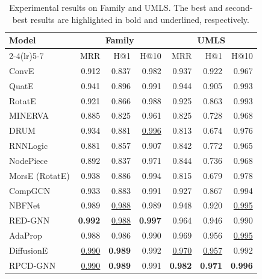 \documentclass[a4paper,fleqn]{cas-dc}
\newcommand{\papertablestyle}{%
  \footnotesize
  \renewcommand{\arraystretch}{1.12}%
  \setlength{\tabcolsep}{3pt}%
}
\begin{document}
\begin{table}[width=0.85\textwidth,pos=t]
\caption{Experimental results on Family and UMLS. The best and second-best results are highlighted in bold and underlined, respectively.}
\label{tab:main-results-small}
\centering
\papertablestyle
\begin{tabular*}{\tblwidth}{@{}l@{\extracolsep{\fill}}rrrrrr@{}}
\toprule
Model
& \multicolumn{3}{c}{Family}
& \multicolumn{3}{c}{UMLS} \\
\cmidrule(lr){2-4}\cmidrule(lr){5-7}
& MRR & H@1 & H@10 & MRR & H@1 & H@10 \\
\midrule
ConvE & 0.912 & 0.837 & 0.982 & 0.937 & 0.922 & 0.967 \\
QuatE & 0.941 & 0.896 & 0.991 & 0.944 & 0.905 & 0.993 \\
RotatE & 0.921 & 0.866 & 0.988 & 0.925 & 0.863 & 0.993 \\
MINERVA & 0.885 & 0.825 & 0.961 & 0.825 & 0.728 & 0.968 \\
DRUM & 0.934 & 0.881 & \underline{0.996} & 0.813 & 0.674 & 0.976 \\
RNNLogic & 0.881 & 0.857 & 0.907 & 0.842 & 0.772 & 0.965 \\
NodePiece & 0.892 & 0.837 & 0.971 & 0.844 & 0.736 & 0.968 \\
MorsE (RotatE) & 0.938 & 0.886 & 0.994 & 0.815 & 0.679 & 0.978 \\
\midrule
CompGCN & 0.933 & 0.883 & 0.991 & 0.927 & 0.867 & 0.994 \\
NBFNet & 0.989 & \underline{0.988} & 0.989 & 0.948 & 0.920 & \underline{0.995} \\
RED-GNN & \textbf{0.992} & \underline{0.988} & \textbf{0.997} & 0.964 & 0.946 & 0.990 \\
AdaProp & 0.988 & 0.986 & 0.990 & 0.969 & 0.956 & \underline{0.995} \\
DiffusionE & \underline{0.990} & \textbf{0.989} & 0.992 & \underline{0.970} & \underline{0.957} & 0.992 \\
RPCD-GNN & \underline{0.990} & \textbf{0.989} & 0.991 & \textbf{0.982} & \textbf{0.971} & \textbf{0.996} \\
\bottomrule
\end{tabular*}
\end{table}
\end{document}
